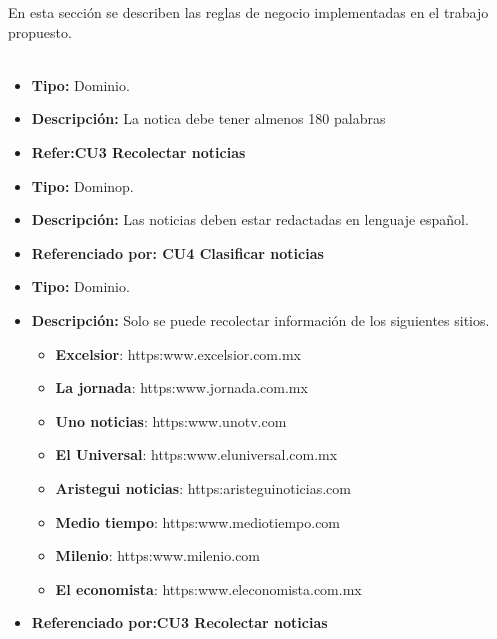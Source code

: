 

En esta sección se describen las reglas de negocio implementadas en el trabajo propuesto.\\\\
\begin{itemize}
  \item \textbf{Tipo:} Dominio.  
  \item \textbf{Descripción:}  La notica debe tener almenos 180 palabras
  \item \textbf{Refer:CU3 Recolectar noticias} 
\end{itemize}


\begin{itemize}
  \item \textbf{Tipo:} Dominop.  
  \item \textbf{Descripción:} Las noticias deben estar redactadas en lenguaje español.
  \item \textbf{Referenciado por: CU4 Clasificar noticias}  \\
\end{itemize}

\begin{itemize}
  \item \textbf{Tipo:} Dominio.
  \item \textbf{Descripción:} Solo se puede recolectar información de los siguientes sitios.\\

  \begin{itemize}

    \item \textbf{Excelsior}: https:\/\/www.excelsior.com.mx
    \item \textbf{La jornada}: https:\/\/www.jornada.com.mx
    \item \textbf{Uno noticias}: https:\/\/www.unotv.com
    \item \textbf{El Universal}: https:\/\/www.eluniversal.com.mx
    \item \textbf{Aristegui noticias}: https:\/\/aristeguinoticias.com
    \item \textbf{Medio tiempo}: https:\/\/www.mediotiempo.com
    \item \textbf{Milenio}: https:\/\/www.milenio.com 
    \item \textbf{El economista}: https:\/\/www.eleconomista.com.mx

  \end{itemize} 
  \item \textbf{Referenciado por:CU3 Recolectar noticias}  \\
\end{itemize}

